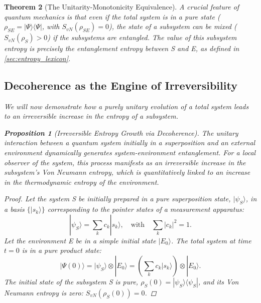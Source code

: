 \documentclass[11pt, letterpaper]{report}
\theoremstyle{plain} %
\newtheorem{theorem}{Theorem}[chapter]
\newtheorem{proposition}[theorem]{Proposition}
\theoremstyle{definition} %
\theoremstyle{remark} %
\begin{document}
\begin{theorem}[The Unitarity-Monotonicity Equivalence]
A crucial feature of quantum mechanics is that even if the total system is in a pure state ($\rho_{SE} = |\Psi\rangle\langle\Psi|$, with $S_{vN}(\rho_{SE})=0$), the state of a subsystem can be mixed ($S_{vN}(\rho_S)>0$) if the subsystems are entangled. The value of this subsystem entropy is precisely the entanglement entropy between S and E, as defined in \cref{sec:entropy_lexicon}.

\subsection{Decoherence as the Engine of Irreversibility}
We will now demonstrate how a purely unitary evolution of a total system leads to an irreversible increase in the entropy of a subsystem.

\begin{proposition}[Irreversible Entropy Growth via Decoherence]
\label{prop:decoherence_entropy_growth}
The unitary interaction between a quantum system initially in a superposition and an external environment dynamically generates system-environment entanglement. For a local observer of the system, this process manifests as an irreversible increase in the subsystem's Von Neumann entropy, which is quantitatively linked to an increase in the thermodynamic entropy of the environment.
\end{proposition}
\begin{proof}
Let the system S be initially prepared in a pure superposition state, $|\psi_S\rangle$, in a basis $\{|s_k\rangle\}$ corresponding to the pointer states of a measurement apparatus:
\begin{equation}
    |\psi_S\rangle = \sum_k c_k |s_k\rangle, \quad \text{with} \quad \sum_k |c_k|^2 = 1.
\end{equation}
Let the environment E be in a simple initial state $|E_0\rangle$. The total system at time $t=0$ is in a pure product state:
\begin{equation}
    |\Psi(0)\rangle = |\psi_S\rangle \otimes |E_0\rangle = \left(\sum_k c_k |s_k\rangle\right) \otimes |E_0\rangle.
\end{equation}
The initial state of the subsystem S is pure, $\rho_S(0) = |\psi_S\rangle\langle\psi_S|$, and its Von Neumann entropy is zero: $S_{vN}(\rho_S(0)) = 0$.


\end{proof}
\end{theorem}
\end{document}

